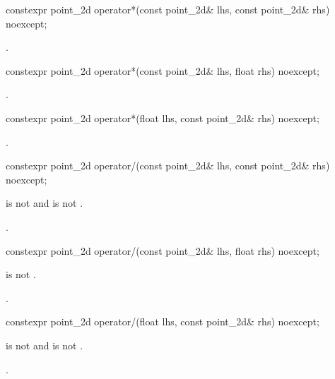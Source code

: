 %
\begin{itemdecl}
constexpr point_2d operator*(const point_2d& lhs, const point_2d& rhs) 
  noexcept;
\end{itemdecl}
\begin{itemdescr}
\pnum
\returns
{}.
\end{itemdescr}

%
\begin{itemdecl}
constexpr point_2d operator*(const point_2d& lhs, float rhs) noexcept;
\end{itemdecl}
\begin{itemdescr}
\pnum
\returns
{}.
\end{itemdescr}

%
\begin{itemdecl}
constexpr point_2d operator*(float lhs, const point_2d& rhs) noexcept;
\end{itemdecl}
\begin{itemdescr}
\pnum
\returns
{}.
\end{itemdescr}

%
\begin{itemdecl}
constexpr point_2d operator/(const point_2d& lhs, const point_2d& rhs) 
  noexcept;
\end{itemdecl}
\begin{itemdescr}
\pnum
\requires
{} is not  and  is not .

\pnum
\returns
{}.
\end{itemdescr}

%
\begin{itemdecl}
constexpr point_2d operator/(const point_2d& lhs, float rhs) noexcept;
\end{itemdecl}
\begin{itemdescr}
\pnum
\requires
{} is not .

\pnum
\returns
{}.
\end{itemdescr}

%
\begin{itemdecl}
constexpr point_2d operator/(float lhs, const point_2d& rhs) noexcept;
\end{itemdecl}
\begin{itemdescr}
\pnum
\requires
{} is not  and  is not .

\pnum
\returns
{}.
\end{itemdescr}
